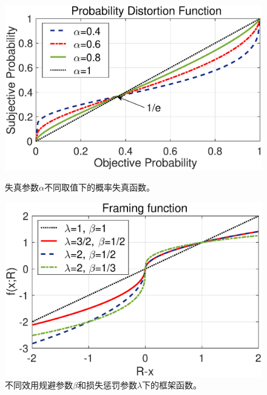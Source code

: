 \begin{figure}
\centering
\includegraphics[scale=0.58]{./pic/dist_func.eps}
\caption{失真参数$\alpha$不同取值下的概率失真函数。}\label{fg:dist_func}
\vspace{0.1cm}
\centering
\includegraphics[scale=0.58]{./pic/fram_func.eps}
\caption{不同效用规避参数$\beta$和损失惩罚参数$\lambda$下的框架函数。}\label{fg:fram_func}
\end{figure}

